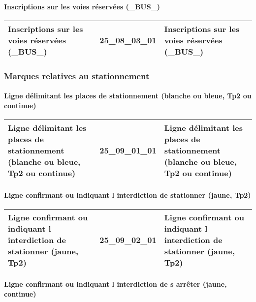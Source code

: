 \documentclass[12pt,titlepage,oneside]{book}
\begin{document}
\paragraph{Inscriptions sur les voies réservées (\_BUS\_)}
\noindent
\vspace{\baselineskip}

\renewcommand{\arraystretch}{1.2}
\begin{supertabular}{|p{10cm}|c|p{15cm}|}
 Inscriptions sur les voies réservées (\_BUS\_) & 25\_08\_03\_01 & Inscriptions sur les voies réservées (\_BUS\_)\\
\hline
\end{supertabular}

\subsubsection{\large Marques relatives au stationnement}
\paragraph{Ligne délimitant les places de stationnement (blanche ou bleue, Tp2 ou continue)}
\noindent
\vspace{\baselineskip}

\renewcommand{\arraystretch}{1.2}
\begin{supertabular}{|p{10cm}|c|p{15cm}|}
 Ligne délimitant les places de stationnement (blanche ou bleue, Tp2 ou continue) & 25\_09\_01\_01 & Ligne délimitant les places de stationnement (blanche ou bleue, Tp2 ou continue)\\
\hline
\end{supertabular}


\paragraph{Ligne confirmant ou indiquant l interdiction de stationner (jaune, Tp2)}
\noindent
\vspace{\baselineskip}

\renewcommand{\arraystretch}{1.2}
\begin{supertabular}{|p{10cm}|c|p{15cm}|}
 Ligne confirmant ou indiquant l interdiction de stationner (jaune, Tp2) & 25\_09\_02\_01 & Ligne confirmant ou indiquant l interdiction de stationner (jaune, Tp2)\\
\hline
\end{supertabular}


\paragraph{Ligne confirmant ou indiquant l interdiction de s arrêter (jaune, continue)}
\noindent
\vspace{\baselineskip}
\end{document}
